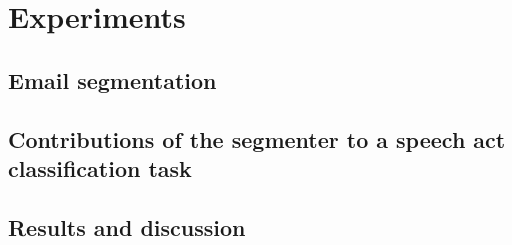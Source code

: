\section{Experiments}




\subsection{Email segmentation}

\subsection{Contributions of the segmenter to a speech act classification task}

\subsection{Results and discussion}
